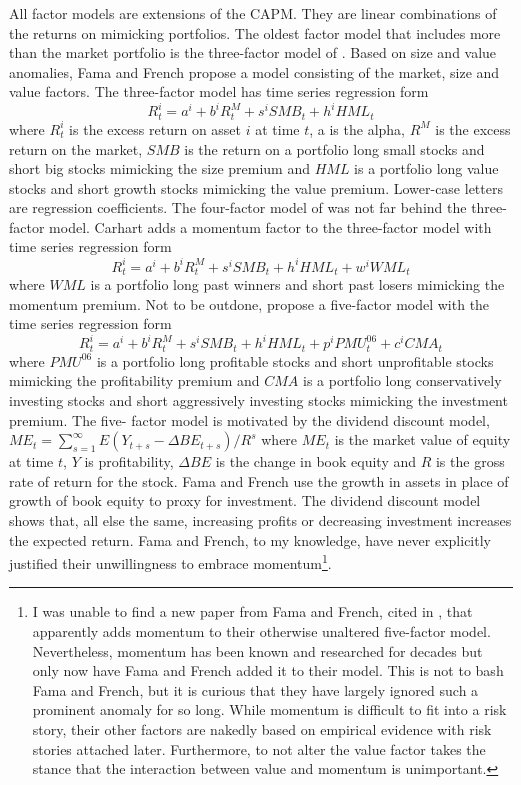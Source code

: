 All factor models are extensions of the CAPM. They are linear combinations of the returns
on mimicking portfolios. The oldest factor model that includes more than the market
portfolio is the three-factor model of \textcite{fama1993common}. Based on size and value
anomalies, Fama and French propose a model consisting of the market, size and value
factors. The three-factor model has time series regression form
\[
R_t^i=a^i+b^iR_t^M+s^iSMB_t+h^iHML_t
\]
where $R_t^i$ is the excess return on asset $i$ at time $t$, a is the alpha, $R^M$ is the
excess return on the market, $SMB$ is the return on a portfolio long small stocks and
short big stocks mimicking the size premium and $HML$ is a portfolio long value stocks and
short growth stocks mimicking the value premium. Lower-case letters are regression
coefficients. The four-factor model of \textcite{carhart1997persistence} was not far
behind the three-factor model. Carhart adds a momentum factor to the three-factor model
with time series regression form
\[
R_t^i=a^i+b^iR_t^M+s^iSMB_t+h^iHML_t+w^iWML_t
\]
where $WML$ is a portfolio long past winners and short past losers mimicking the momentum
premium. Not to be outdone, \textcite{fama2015five} propose a five-factor model with the
time series regression form
\[
R_t^i=a^i+b^iR_t^M+s^iSMB_t+h^iHML_t+p^iPMU_t^{06}+c^iCMA_t
\]
where $PMU^{06}$ is a portfolio long profitable stocks and short unprofitable stocks
mimicking the profitability premium and $CMA$ is a portfolio long conservatively investing
stocks and short aggressively investing stocks mimicking the investment premium. The five-
factor model is motivated by the dividend discount model,
$ME_t=\sum_{s=1}^{\infty}{E\left(Y_{t+s}-\Delta BE_{t+s}\right)/R^s}$ where $ME_t$ is the
market value of equity at time $t$, $Y$ is profitability, $\Delta BE$ is the change in
book equity and $R$ is the gross rate of return for the stock. Fama and French use the
growth in assets in place of growth of book equity to proxy for investment. The dividend
discount model shows that, all else the same, increasing profits or decreasing investment
increases the expected return. Fama and French, to my knowledge, have never explicitly
justified their unwillingness to embrace momentum\footnote{I was unable to find a new
paper from Fama and French, cited in \textcite{barillas2017model}, that apparently adds
momentum to their otherwise unaltered five-factor model. Nevertheless, momentum has been
known and researched for decades but only now have Fama and French added it to their
model. This is not to bash Fama and French, but it is curious that they have largely
ignored such a prominent anomaly for so long. While momentum is difficult to fit into a
risk story, their other factors are nakedly based on empirical evidence with risk stories
attached later. Furthermore, to not alter the value factor takes the stance that the
interaction between value and momentum is unimportant.}.

